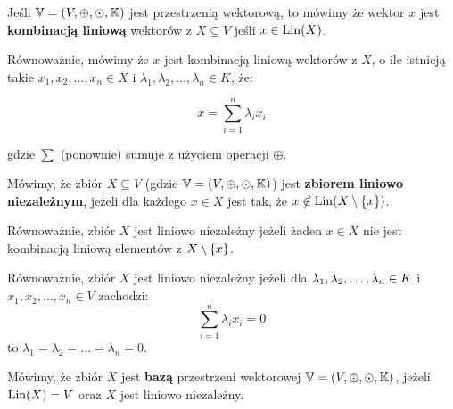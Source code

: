 \begin{definition}
	Jeśli \( \mathbb{V} = (V, \oplus, \odot, \mathbb{K})\) jest przestrzenią wektorową, to mówimy że wektor \(x\) jest \textbf{kombinacją liniową} wektorów z \(X \subseteq V\) jeśli \(x \in {\mathrm{Lin}}(X)\).

	Równoważnie, mówimy że \(x\) jest kombinacją liniową wektorów z \(X\), o ile istnieją takie \(x_1, x_2, \dots, x_n \in X\) i \(\lambda_1, \lambda_2, \dots, \lambda_n \in K\), że:

	\[
		x = \sum_{i=1}^{n} \lambda_i x_i
	\]

	gdzie \(\sum\) (ponownie) sumuje z użyciem operacji \(\oplus\).
\end{definition}

\begin{definition}
	\label{linear-dependence}
	Mówimy, że zbiór \(X \subseteq V\) (gdzie \( \mathbb{V} = (V, \oplus, \odot, \mathbb{K}) \)) jest \textbf{zbiorem liniowo niezależnym}, jeżeli dla każdego \(x \in X\) jest tak, że \(x \not\in \lin(X \setminus \set{x})\).

	Równoważnie, zbiór \(X\) jest liniowo niezależny jeżeli żaden \(x \in X\) nie jest kombinacją liniową elementów z \(X \setminus\set{x}\).

	Równoważnie, zbiór \(X\) jest liniowo niezależny jeżeli dla \(\lambda_1, \lambda_2, \dots, \lambda_n \in K\) i \(x_1, x_2, \dots, x_n \in V\) zachodzi:
	\[
		\sum_{i=1}^{n} \lambda_i x_i = 0
	\]
	to \(\lambda_1 = \lambda_2 = \dots = \lambda_n = 0\).
\end{definition}

\begin{definition}[Baza]
	Mówimy, że zbiór \(X\) jest \textbf{bazą} przestrzeni wektorowej \( \mathbb{V} = (V, \oplus, \odot, \mathbb{K})\), jeżeli \({\mathrm{Lin}}(X) = V\) oraz \(X\) jest liniowo niezależny.
\end{definition}

